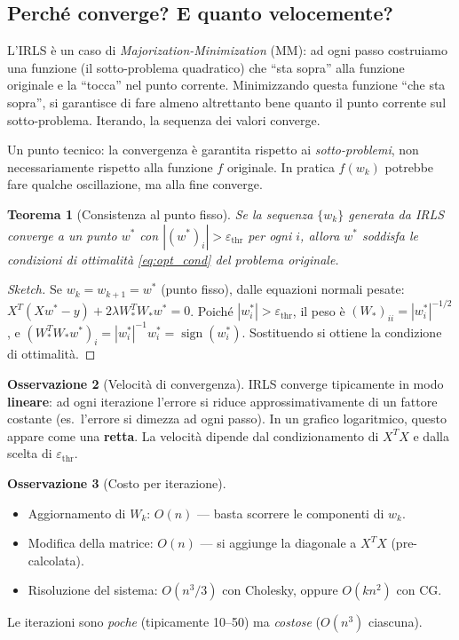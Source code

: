 \documentclass[a4paper,11pt]{article}
\newtheorem{theorem}{Teorema}[section]
\theoremstyle{definition}
\newtheorem{remark}[theorem]{Osservazione}
\DeclareMathOperator{\sign}{sign}
\begin{document}
\subsection{Perché converge? E quanto velocemente?}
\label{subsec:irls_convergence}

\begin{intuizione}
L'IRLS è un caso di \emph{Majorization-Minimization} (MM): ad ogni passo costruiamo una funzione (il sotto-problema quadratico) che ``sta sopra'' alla funzione originale e la ``tocca'' nel punto corrente. Minimizzando questa funzione ``che sta sopra'', si garantisce di fare almeno altrettanto bene quanto il punto corrente sul sotto-problema. Iterando, la sequenza dei valori converge.

Un punto tecnico: la convergenza è garantita rispetto ai \emph{sotto-problemi}, non necessariamente rispetto alla funzione $f$ originale. In pratica $f(w_k)$ potrebbe fare qualche oscillazione, ma alla fine converge.
\end{intuizione}

\begin{theorem}[Consistenza al punto fisso]
Se la sequenza $\{w_k\}$ generata da IRLS converge a un punto $w^*$ con $|(w^*)_i| > \varepsilon_{\text{thr}}$ per ogni $i$, allora $w^*$ soddisfa le condizioni di ottimalità \eqref{eq:opt_cond} del problema originale.
\end{theorem}

\begin{proof}[Sketch]
Se $w_k = w_{k+1} = w^*$ (punto fisso), dalle equazioni normali pesate: $X^T(Xw^* - y) + 2\lambda W_*^TW_* w^* = 0$. Poiché $|w^*_i| > \varepsilon_{\text{thr}}$, il peso è $(W_*)_{ii} = |w^*_i|^{-1/2}$, e $(W_*^TW_*w^*)_i = |w^*_i|^{-1}w^*_i = \sign(w^*_i)$. Sostituendo si ottiene la condizione di ottimalità.
\end{proof}

\begin{remark}[Velocità di convergenza]
IRLS converge tipicamente in modo \textbf{lineare}: ad ogni iterazione l'errore si riduce approssimativamente di un fattore costante (es.\ l'errore si dimezza ad ogni passo). In un grafico logaritmico, questo appare come una \textbf{retta}. La velocità dipende dal condizionamento di $X^TX$ e dalla scelta di $\varepsilon_{\text{thr}}$.
\end{remark}

\begin{remark}[Costo per iterazione]
\begin{itemize}[nosep]
  \item Aggiornamento di $W_k$: $O(n)$ --- basta scorrere le componenti di $w_k$.
  \item Modifica della matrice: $O(n)$ --- si aggiunge la diagonale a $X^TX$ (pre-calcolata).
  \item Risoluzione del sistema: $O(n^3/3)$ con Cholesky, oppure $O(kn^2)$ con CG.
\end{itemize}
Le iterazioni sono \emph{poche} (tipicamente 10--50) ma \emph{costose} ($O(n^3)$ ciascuna).
\end{remark}
\end{document}
